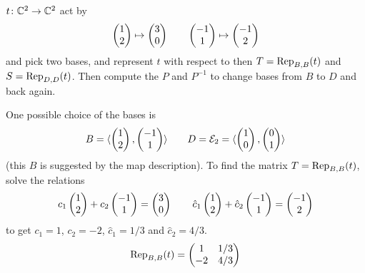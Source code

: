 \begin{exercises}
     \( \map{t}{\C^2}{\C^2} \) act by
     \begin{equation*}
        \colvec{1 \\ 2}\mapsto\colvec{3 \\ 0}
        \qquad
        \colvec{-1 \\ 1}\mapsto\colvec{-1 \\ 2}
     \end{equation*}
     and pick two bases,
     and represent \( t \) with respect to then
     \( T=\rep{t}{B,B} \) and \( S=\rep{t}{D,D} \).
     Then compute 
     the \( P \) and \( P^{-1} \) to change bases from \( B \) to \( D \) and
     back again.
     \begin{answer}
       One possible choice of the bases is 
       \begin{equation*}
         B=\sequence{\colvec{1 \\ 2},\colvec{-1 \\ 1}}
         \qquad
         D=\stdbasis_2=\sequence{\colvec{1 \\ 0},\colvec{0 \\ 1}}
       \end{equation*}
       (this $B$ is suggested by the map description).
       To find the matrix $T=\rep{t}{B,B}$, solve the relations 
       \begin{equation*}
          c_1\colvec{1 \\ 2}+c_2\colvec{-1 \\ 1}=\colvec{3 \\ 0}
          \qquad
         \hat{c}_1\colvec{1 \\ 2}+\hat{c}_2\colvec{-1 \\ 1}=\colvec{-1 \\ 2}
       \end{equation*}
       to get \( c_1=1 \), \( c_2=-2 \), \( \hat{c}_1=1/3 \) and
       \( \hat{c}_2=4/3 \).
       \begin{equation*}
          \rep{t}{B,B}=
          \begin{pmatrix}
             1  &1/3 \\
            -2  &4/3
          \end{pmatrix}
       \end{equation*}


\end{answer}
\end{exercises}
